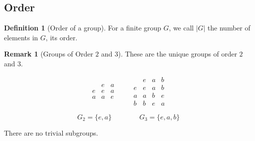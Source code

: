 \documentclass[11pt]{article}
\newcommand{\1}{\mathbf{1}}
\theoremstyle{notestyle}
\theoremstyle{definition}
\newtheorem{definition}[theorem]{Definition}
\newtheorem{remark}[theorem]{Remark}
\begin{document}
\subsection{Order}

\begin{definition}[Order of a group]
\label{def:group-order}
For a finite group $G$, we call $|G|$ the number of elements in $G$, its order.
\end{definition}

\newpage

\begin{remark}[Groups of Order $2$ and $3$]
\label{rem:orders-two-three}
These are the unique groups of order $2$ and $3$.
\end{remark}

$$
\begin{array}{c|cc}
 & e & a \\ \hline
e & e & a \\
a & a & e
\end{array}
\qquad
\begin{array}{c|ccc}
 & e & a & b \\ \hline
e & e & a & b \\
a & a & b & e \\
b & b & e & a
\end{array}
$$

$$
\boxed{G_2 = \{e,a\}}
\qquad\qquad
\boxed{G_3 = \{e,a,b\}}
$$

There are no trivial subgroups.
\end{document}

